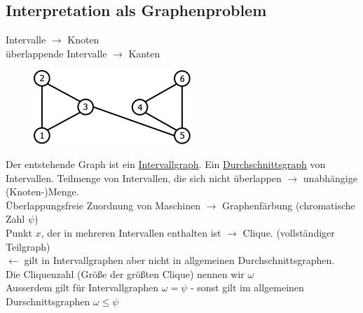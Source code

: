 \subsection{Interpretation als Graphenproblem}
Intervalle $\rightarrow$ Knoten\\
überlappende Intervalle $\rightarrow$ Kanten\\
\begin{figure}[h]
    \begin{center}
        \includegraphics[width=\textwidth / 2]{../GFX/vl13_5.png}
        \label{fig:vl13_1}
    \end{center}
\end{figure}
Der entstehende Graph ist ein \underline{Intervallgraph}. Ein \underline{Durchschnittsgraph} von Intervallen.
Teilmenge von Intervallen, die sich nicht überlappen $\rightarrow$ unabhängige (Knoten-)Menge.\\
Überlappungsfreie Zuordnung von Maschinen $\rightarrow$ Graphenfärbung (chromatische Zahl $\psi$)\\
Punkt $x$, der in mehreren Intervallen enthalten ist $\rightarrow$ Clique. (vollständiger Teilgraph)\\
$\leftarrow$ gilt in Intervallgraphen aber nicht in allgemeinen Durchschnittsgraphen.\\
Die Cliquenzahl (Größe der größten Clique) nennen wir $\omega$\\
Ausserdem gilt für Intervallgraphen $\omega = \psi$ - sonst gilt im allgemeinen Durschnittsgraphen $\omega \leq \psi$\\

